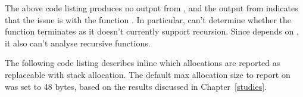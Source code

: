 

The above code listing produces no output from , and the output from  indicates that the issue is with the function . In particular,  can't determine whether the function terminates as it doesn't currently support recursion. Since  depends on , it also can't analyse recursive functions.

The following code listing describes inline which allocations are reported as replaceable with stack allocation. The default max allocation size to report on was set to 48 bytes, based on the results discussed in Chapter~\ref{studies}.



